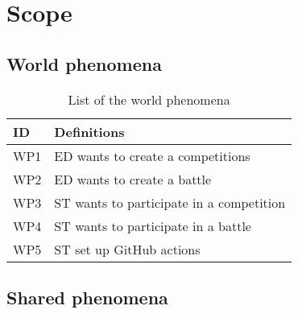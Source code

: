 \section{Scope}
\label{s:Scope}%

\subsection{World phenomena}
\label{ss:world_phenomena}%

\begin{table}[H]
  \begin{tabular}{|l|l|}

    \hline
    \textbf{ID} & \textbf{Definitions}      \\
    \hline
    WP1 & ED wants to create a competitions \\
    \hline
    WP2 & ED wants to create a battle \\
    \hline
    WP3 & ST wants to participate in a competition \\
    \hline
    WP4 & ST wants to participate in a battle     \\
    \hline
    WP5 & ST set up GitHub actions    \\
    \hline
    
  \end{tabular}
  \caption{List of the world phenomena}
  \label{tab:worldPhenomena}
\end{table}

\subsection{Shared phenomena}
\label{ss:shared_phenomena}%

